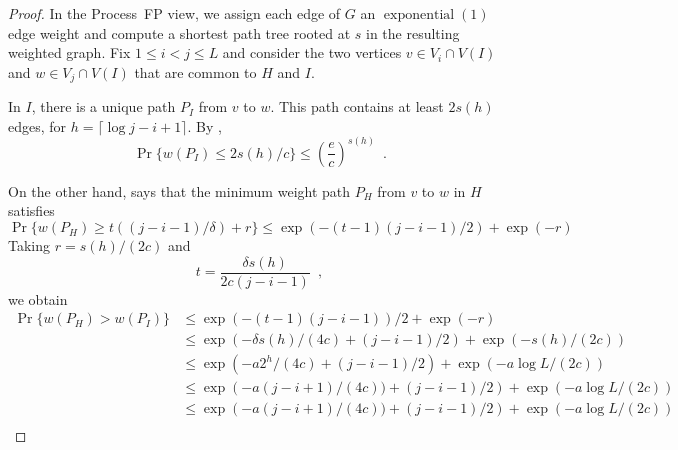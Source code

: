 \documentclass{patmorin}
\DeclareMathOperator{\exponential}{exponential}
\begin{document}
\begin{proof}
  In the Process~FP view, we assign each edge of $G$ an $\exponential(1)$
  edge weight and compute a shortest path tree rooted at $s$ in the
  resulting weighted graph.  Fix $1\le i< j\le L$ and consider the two
  vertices $v\in V_i\cap V(I)$ and $w\in V_j\cap V(I)$ that are common
  to $H$ and $I$.

  In $I$, there is a unique path $P_I$ from $v$ to $w$.  This path
  contains at least $2s(h)$ edges, for $h=\lceil\log j-i+1 \rceil$.
  By , 
  \[
     \Pr\{w(P_I) \le 2s(h)/c\} \le \left(\frac{e}{c}\right)^{s(h)} \enspace .
  \]

  On the other hand,  says that the minimum weight path
  $P_H$ from $v$ to $w$ in $H$ satisfies
  \[
     \Pr\{w(P_H) \ge t((j-i-1)/\delta)+r\} \le \exp(-(t-1)(j-i-1)/2) + \exp(-r)
  \]
  Taking $r=s(h)/(2c)$ and
  \[
      t = \frac{\delta s(h)}{2c(j-i-1)} \enspace, 
  \]
  we obtain
  \begin{align*}
     \Pr\{w(P_H) > w(P_I)\} & \le \exp(-(t-1)(j-i-1))/2 + \exp(-r) \\
         & \le \exp\left(-\delta s(h)/(4c) + (j-i-1)/2\right)
                               + \exp(-s(h)/(2c)) \\
         & \le \exp\left(-a2^h/(4c) + (j-i-1)/2\right)
                               + \exp(-a\log L/(2c)) \\
         & \le \exp\left(-a(j-i+1)/(4c)) + (j-i-1)/2\right)
                               + \exp(-a\log L/(2c)) \\
         & \le \exp\left(-a(j-i+1)/(4c)) + (j-i-1)/2\right)
                               + \exp(-a\log L/(2c)) \\
  \end{align*}
 \end{proof}
\end{document}
